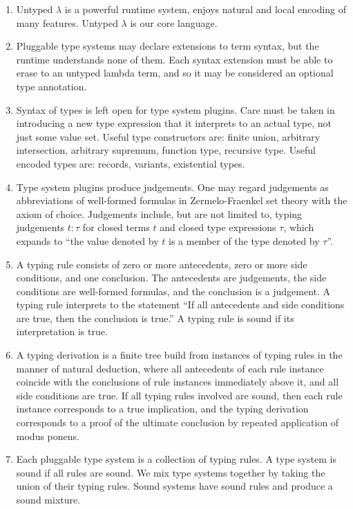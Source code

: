\documentclass{amsart}
\begin{document}
\begin{enumerate}
\item Untyped $\lambda$ is a powerful runtime system, enjoys
natural and local encoding of many features. Untyped $\lambda$ is
our core language.

\item Pluggable type systems may declare extensions to term
syntax, but the runtime understands none of them. Each syntax
extension must be able to erase to an untyped lambda term, and so
it may be considered an optional type annotation.

\item Syntax of types is left open for type system plugins. Care
must be taken in introducing a new type expression that it
interprets to an actual type, not just some value set. Useful
type constructors are: finite union, arbitrary intersection,
arbitrary supremum, function type, recursive type. Useful encoded
types are: records, variants, existential types.

\item Type system plugins produce judgements. One may regard
judgements as abbreviations of well-formed formulas in
Zermelo-Fraenkel set theory with the axiom of choice. Judgements
include, but are not limited to, typing judgements $t:\tau$ for
closed terms $t$ and closed type expressions $\tau$, which
expands to ``the value denoted by $t$ is a member of the type
denoted by $\tau$''.

\item A typing rule consists of zero or more antecedents, zero or
more side conditions, and one conclusion. The antecedents are
judgements, the side conditions are well-formed formulas, and the
conclusion is a judgement. A typing rule interprets to the
statement ``If all antecedents and side conditions are true, then
the conclusion is true.'' A typing rule is sound if its
interpretation is true.

\item A typing derivation is a finite tree build from instances
of typing rules in the manner of natural deduction, where all
antecedents of each rule instance coincide with the conclusions
of rule instances immediately above it, and all side conditions
are true. If all typing rules involved are sound, then each rule
instance corresponds to a true implication, and the typing
derivation corresponds to a proof of the ultimate conclusion by
repeated application of modus ponens.

\item Each pluggable type system is a collection of typing rules.
A type system is sound if all rules are sound. We mix type
systems together by taking the union of their typing rules. Sound
systems have sound rules and produce a sound mixture.
\end{enumerate}
\end{document}
